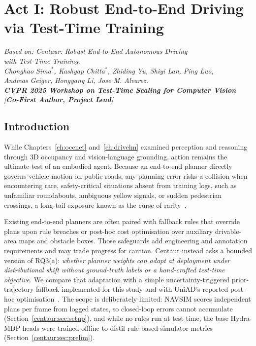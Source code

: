 \chapter{Act I: Robust End-to-End Driving via Test-Time Training}\label{ch:centaur}
\begin{flushright}
\itshape
Based on: Centaur: Robust End-to-End Autonomous Driving\\
with Test-Time Training.\\
Chonghao Sima$^{*}$, Kashyap Chitta$^{*}$, Zhiding Yu, Shiyi Lan, Ping Luo,\\
Andreas Geiger, Hongyang Li, Jose M. Alvarez.\\
\textbf{CVPR 2025 Workshop on Test-Time Scaling for Computer Vision}\\
{[\textbf{Co-First Author, Project Lead}]}
\end{flushright}
\vspace{0.6em}

\section{Introduction}\label{centaur:sec:intro}

While Chapters~\ref{ch:occnet} and~\ref{ch:drivelm} examined perception and reasoning through 3D occupancy and vision-language grounding, action remains the ultimate test of an embodied agent. Because an end-to-end planner directly governs vehicle motion on public roads, any planning error risks a collision when encountering rare, safety-critical situations absent from training logs, such as unfamiliar roundabouts, ambiguous yellow signals, or sudden pedestrian crossings, a long-tail exposure known as the curse of rarity~\cite{liu2024curse}.

Existing end-to-end planners are often paired with fallback rules that override plans upon rule breaches or post-hoc cost optimisation over auxiliary drivable-area maps and obstacle boxes. Those safeguards add engineering and annotation requirements and may trade progress for caution. Centaur instead asks a bounded version of RQ3(a): \emph{whether planner weights can adapt at deployment under distributional shift without ground-truth labels or a hand-crafted test-time objective.} We compare that adaptation with a simple uncertainty-triggered prior-trajectory fallback implemented for this study and with UniAD's reported post-hoc optimisation~\cite{hu2023uniad}. The scope is deliberately limited: NAVSIM scores independent plans per frame from logged states, so closed-loop errors cannot accumulate (Section~\ref{centaur:sec:setup}), and while no rules run at test time, the base Hydra-MDP heads were trained offline to distil rule-based simulator metrics (Section~\ref{centaur:sec:prelim}).

